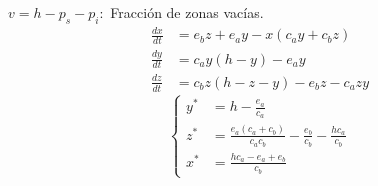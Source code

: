 \documentclass[twocolumn,aps,prl]{revtex4-1}
\begin{document}
$v=h-p_{s}-p_{i}:$ Fracción de zonas vacías.
$$
\begin{aligned}
    \frac{d     x}{d t} &= e_{b} z +e_{a}  y -x\left(c_{a}  y +c_{b} z \right) \\
    \frac{d  y }{d t} &= c_{a}  y \left(h- y \right)-e_{a}  y  \\
    \frac{d z }{d t} &= c_{b} z \left(h-z - y \right)-e_{b} z -c_{a} z   y  
\end{aligned} 
$$
\begin{equation}
    \left\{
    \begin{aligned}
        y^{*} &= h - \frac{e_{a}}{c_{a}} \\
        z^{*} &= \frac{e_{a} \left( c_{a} + c_{b} \right)}{c_{a} c_{b}} - \frac{e_{b}}{c_{b}} - \frac{h c_{a}}{c_{b}} \\
        x^{*} &= \frac{h c_{a} - e_{a} + e_{b}}{c_{b}}
    \end{aligned}
    \right.
\end{equation}
\end{document}
